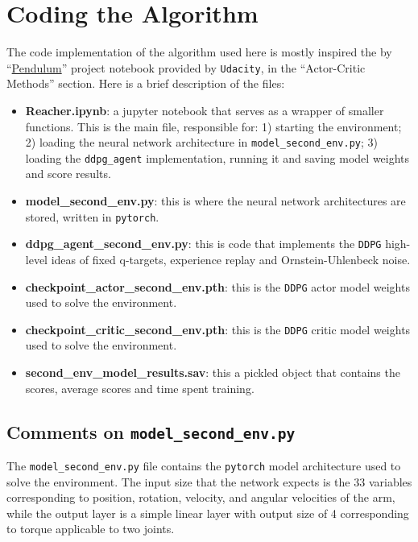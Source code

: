 \documentclass[
]{article}
\begin{document}
\hypertarget{coding-the-algorithm}{%
\section{Coding the Algorithm}\label{coding-the-algorithm}}

The code implementation of the algorithm used here is mostly inspired
the by
``\href{https://github.com/udacity/deep-reinforcement-learning/tree/master/ddpg-pendulum}{Pendulum}''
project notebook provided by \texttt{Udacity}, in the ``Actor-Critic
Methods'' section. Here is a brief description of the files:

\begin{itemize}
\item
  \textbf{Reacher.ipynb}: a jupyter notebook that serves as a wrapper of
  smaller functions. This is the main file, responsible for: 1) starting
  the environment; 2) loading the neural network architecture in
  \texttt{model\_second\_env.py}; 3) loading the \texttt{ddpg\_agent}
  implementation, running it and saving model weights and score results.
\item
  \textbf{model\_second\_env.py}: this is where the neural network
  architectures are stored, written in \texttt{pytorch}.
\item
  \textbf{ddpg\_agent\_second\_env.py}: this is code that implements the
  \texttt{DDPG} high-level ideas of fixed q-targets, experience replay
  and Ornstein-Uhlenbeck noise.
\item
  \textbf{checkpoint\_actor\_second\_env.pth}: this is the \texttt{DDPG}
  actor model weights used to solve the environment.
\item
  \textbf{checkpoint\_critic\_second\_env.pth}: this is the
  \texttt{DDPG} critic model weights used to solve the environment.
\item
  \textbf{second\_env\_model\_results.sav}: this a pickled object that
  contains the scores, average scores and time spent training.
\end{itemize}

\hypertarget{comments-on-model_second_env.py}{%
\subsection{\texorpdfstring{Comments on
\texttt{model\_second\_env.py}}{Comments on model\_second\_env.py}}\label{comments-on-model_second_env.py}}

The \texttt{model\_second\_env.py} file contains the \texttt{pytorch}
model architecture used to solve the environment. The input size that
the network expects is the 33 variables corresponding to position,
rotation, velocity, and angular velocities of the arm, while the output
layer is a simple linear layer with output size of 4 corresponding to
torque applicable to two joints.
\end{document}
